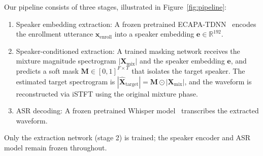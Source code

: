 \documentclass{article}
\begin{document}
Our pipeline consists of three stages, illustrated in Figure~\ref{fig:pipeline}:

\begin{enumerate}
    \item Speaker embedding extraction: A frozen pretrained ECAPA-TDNN~\citep{ECAPA} encodes the enrollment utterance $\mathbf{x}_{\text{enroll}}$ into a speaker embedding $\mathbf{e} \in \mathbb{R}^{192}$.

    \item Speaker-conditioned extraction: A trained masking network receives the mixture magnitude spectrogram $|\mathbf{X}_{\text{mix}}|$ and the speaker embedding $\mathbf{e}$, and predicts a soft mask $\mathbf{M} \in [0,1]^{F \times T}$ that isolates the target speaker. The estimated target spectrogram is $|\hat{\mathbf{X}}_{\text{target}}| = \mathbf{M} \odot |\mathbf{X}_{\text{mix}}|$, and the waveform is reconstructed via iSTFT using the original mixture phase.

    \item ASR decoding: A frozen pretrained Whisper model~\citep{Whisper} transcribes the extracted waveform.
\end{enumerate}

Only the extraction network (stage 2) is trained; the speaker encoder and ASR model remain frozen throughout.
\end{document}
